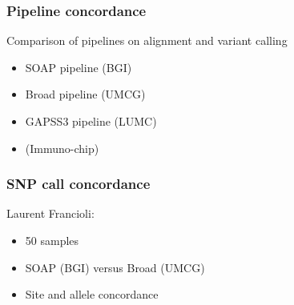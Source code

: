 \documentclass[slidestop,14pt]{beamer}
\begin{document}
\begin{frame}
  \frametitle{Pipeline concordance}

  \vspace{\baselineskip}

  Comparison of pipelines on alignment and variant calling

  \vspace{\baselineskip}

  \pause

  \begin{itemize}[<+->]
    \item SOAP pipeline (BGI)
    \item Broad pipeline (UMCG)
    \item GAPSS3 pipeline (LUMC)
    \item (Immuno-chip)
  \end{itemize}
\end{frame}

\begin{frame}
  \frametitle{SNP call concordance}

  \vspace{\baselineskip}

  Laurent Francioli:
  \begin{itemize}
    \item 50 samples
    \item SOAP (BGI) versus Broad (UMCG)
    \item Site and allele concordance
  \end{itemize}
\end{frame}
\end{document}
